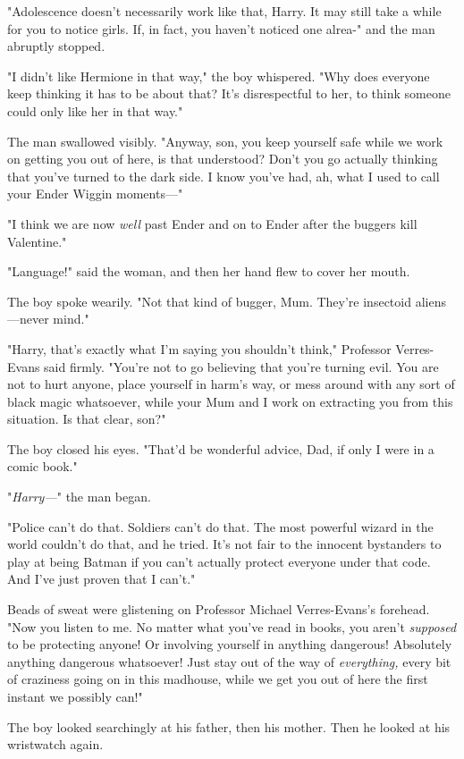 "Adolescence doesn't necessarily work like that, Harry. It may still take a 
while for you to notice girls. If, in fact, you haven't noticed one alrea-" and 
the man abruptly stopped.

"I didn't like Hermione in that way," the boy whispered. "Why does everyone 
keep thinking it has to be about that? It's disrespectful to her, to think 
someone could only like her in that way."

The man swallowed visibly. "Anyway, son, you keep yourself safe while we work 
on getting you out of here, is that understood? Don't you go actually thinking 
that you've turned to the dark side. I know you've had, ah, what I used to call 
your Ender Wiggin moments---"

"I think we are now \emph{well} past Ender and on to Ender after the buggers 
kill Valentine."

"Language!" said the woman, and then her hand flew to cover her mouth.

The boy spoke wearily. "Not that kind of bugger, Mum. They're insectoid 
aliens---never mind."

"Harry, that's exactly what I'm saying you shouldn't think," Professor 
Verres-Evans said firmly. "You're not to go believing that you're turning evil. 
You are not to hurt anyone, place yourself in harm's way, or mess around with 
any sort of black magic whatsoever, while your Mum and I work on extracting you 
from this situation. Is that clear, son?"

The boy closed his eyes. "That'd be wonderful advice, Dad, if only I were in a 
comic book."

"\emph{Harry---}" the man began.

"Police can't do that. Soldiers can't do that. The most powerful wizard in the 
world couldn't do that, and he tried. It's not fair to the innocent bystanders 
to play at being Batman if you can't actually protect everyone under that code. 
And I've just proven that I can't."

Beads of sweat were glistening on Professor Michael Verres-Evans's forehead. 
"Now you listen to me. No matter what you've read in books, you aren't 
\emph{supposed} to be protecting anyone! Or involving yourself in anything 
dangerous! Absolutely anything dangerous whatsoever! Just stay out of the way 
of \emph{everything,} every bit of craziness going on in this madhouse, while 
we get you out of here the first instant we possibly can!"

The boy looked searchingly at his father, then his mother. Then he looked at 
his wristwatch again.

